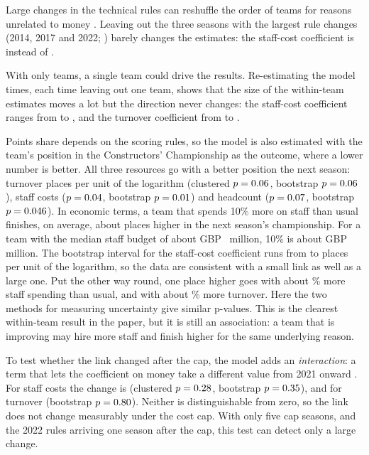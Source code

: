 \documentclass[11pt,a4paper]{article}
\begin{document}
Large changes in the technical rules can reshuffle the order of teams for reasons unrelated to
money \citep{jenkins2010}. Leaving out the three seasons with the largest rule changes (2014, 2017 and 2022;
\citealp{fia2014tech,fia2017tech,fia2022tech}) barely changes the estimates: the staff-cost coefficient is
\NoResetStaff{} instead of \CoefStaffTwfe.

With only \NTeams{} teams, a single team could drive the results. Re-estimating the model
\NTeams{} times, each time leaving out one team, shows that the size of the within-team estimates moves a lot but the
direction never changes: the staff-cost coefficient ranges from \LooStaffcostsMin{} to \LooStaffcostsMax, and the turnover
coefficient from \LooTurnoverMin{} to \LooTurnoverMax.

Points share depends on the scoring rules, so the model is also estimated
with the team's position in the Constructors' Championship as the outcome, where a lower number is better. All three
resources go with a better position the next season: turnover \PosTurnover{} places per unit of the logarithm (clustered
$p = 0.06$, bootstrap $p = 0.06$), staff costs \PosStaffcosts{} ($p = 0.04$, bootstrap
$p = 0.01$) and headcount \PosHeadcount{} ($p = 0.07$, bootstrap $p = 0.046$). In
economic terms, a team that spends 10\% more on staff than usual finishes, on average, about \PosTenStaffcosts{} places
higher in the next season's championship. For a team with the median staff budget of about GBP~\MedStaffM{} million, 10\%
is about GBP~\TenPctStaffM{} million. The bootstrap interval for the staff-cost coefficient runs from
\PosCiBootLowStaffcosts{} to \PosCiBootHighStaffcosts{} places per unit of the logarithm, so the data are consistent with
a small link as well as a large one. Put the other way round, one place higher goes with about \OnePlaceStaff\% more staff
spending than usual, and with about \OnePlaceTurn\% more turnover. Here the two methods for measuring uncertainty give
similar p-values. This is the clearest within-team result in the paper, but it is still an association: a team that is
improving may hire more staff and finish higher for the same underlying reason.

To test whether the link changed after the cap, the model adds an \textit{interaction}: a term
that lets the coefficient on money take a different value from 2021 onward \citep[Chapter~7]{wooldridge2020}. For staff
costs the change is \CapStaff{} (clustered $p = 0.28$, bootstrap $p = 0.35$), and for turnover \CapTurn{}
(bootstrap $p = 0.80$). Neither is distinguishable from zero, so the link does not change measurably under the
cost cap. With only five cap seasons, and the 2022 rules arriving one season after the cap, this test can detect only a
large change.
\end{document}
